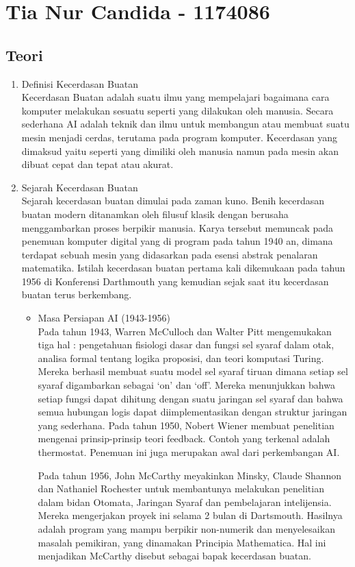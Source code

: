 \section{Tia Nur Candida - 1174086}
\subsection{Teori}
\begin{enumerate}
\item Definisi Kecerdasan Buatan \\
Kecerdasan Buatan adalah suatu ilmu yang mempelajari bagaimana cara komputer melakukan sesuatu seperti yang dilakukan oleh manusia. Secara sederhana AI adalah teknik dan ilmu untuk membangun atau membuat suatu mesin menjadi cerdas, terutama pada program komputer. Kecerdasan yang dimaksud yaitu seperti yang dimiliki oleh manusia namun pada mesin akan dibuat cepat dan tepat atau akurat.

\item Sejarah Kecerdasan Buatan \\
Sejarah kecerdasan buatan dimulai pada zaman kuno. Benih kecerdasan buatan modern ditanamkan oleh filusuf klasik dengan berusaha menggambarkan proses berpikir manusia. Karya tersebut memuncak pada penemuan komputer digital yang di program pada tahun 1940 an, dimana terdapat sebuah mesin yang didasarkan pada esensi abstrak penalaran matematika. 
Istilah kecerdasan buatan pertama kali dikemukaan pada tahun 1956 di Konferensi Darthmouth yang kemudian sejak saat itu kecerdasan buatan terus berkembang.

\begin{itemize}
\item Masa Persiapan AI (1943-1956)\\
Pada tahun 1943, Warren McCulloch dan Walter Pitt mengemukakan tiga hal : pengetahuan fisiologi dasar dan fungsi sel syaraf dalam otak, analisa formal tentang logika proposisi, dan teori komputasi Turing. Mereka berhasil membuat suatu model sel syaraf tiruan dimana setiap sel syaraf digambarkan sebagai ‘on’ dan ‘off’. Mereka menunjukkan bahwa setiap fungsi dapat dihitung dengan suatu jaringan sel syaraf dan bahwa semua hubungan logis dapat diimplementasikan dengan struktur jaringan yang sederhana.
Pada tahun 1950, Nobert Wiener membuat penelitian mengenai prinsip-prinsip teori feedback. Contoh yang terkenal adalah thermostat. Penemuan ini juga merupakan awal dari perkembangan AI.

Pada tahun 1956, John McCarthy meyakinkan Minsky, Claude Shannon dan Nathaniel Rochester untuk membantunya melakukan penelitian dalam bidan Otomata, Jaringan Syaraf dan pembelajaran intelijensia. Mereka mengerjakan proyek ini selama 2 bulan di Dartsmouth. Hasilnya adalah program yang mampu berpikir non-numerik dan menyelesaikan masalah pemikiran, yang dinamakan Principia Mathematica. Hal ini menjadikan McCarthy disebut sebagai bapak kecerdasan buatan.



\end{itemize}
\end{enumerate}
